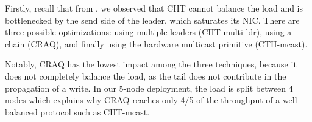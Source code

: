 \begin{comment}
First note the similarities with CHT: writes carry a per-key version, which is decided by the head node and is used to enforce keys are serialized correctly in all nodes.
In addition, in order to support lin reads, writes change the state of keys to \qt{invalid}. When the write is acked  the state changes back to \qt{valid}.

Now note a few important differences with CHT. 
Firstly, there is no commit messages, messages simply commit when the ack (smart-ack that is) is propagated to them from the tail. Notably the tail has a special role: it immediately commits all writes when receiving them, and thus it never transitions its keys to \qt{invalid} state. As such the tail always knows the latest committed value for each key.
As an optimization, reads in non-tail nodes that find the key in \qt{invalid state} are propagated to the tail, instead of being buffered and retried (as in CHT). We implement these as smart-reads: if the tail holds the same version it will answer with a 1-byte opcode. We have found that this optimization does not make a difference compared to the simpler act of buffering, but still use it in our measurements.
Finally, note the big difference maker with respect to CHT: the head does not broadcast the write to everyone; instead it only sends it to the next node.
Consequently, all nodes share in the load of committing a write, except the tail, which only sends back acks.
\end{comment}

Firstly, recall that from , we observed that CHT cannot balance the load and is bottlenecked by the send side of the leader, which saturates its NIC. There are three possible optimizations: using multiple leaders (CHT-multi-ldr), using a chain (CRAQ), and finally using the hardware multicast primitive (CTH-mcast). 

Notably, CRAQ has the lowest impact among the three techniques,
because it does not completely balance the load, as the tail does not contribute in the propagation of a write. In our 5-node deployment, the load is split between 4 nodes which explains why CRAQ reaches only 4/5 of the throughput of a well-balanced protocol such as CHT-mcast.

